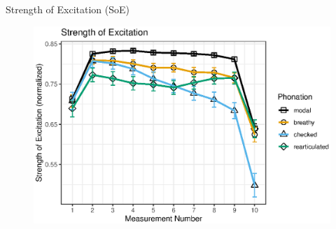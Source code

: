 \documentclass[professionalfonts]{beamer}
\begin{document}
\begin{frame}{Strength of Excitation (SoE)}
  \begin{figure}
    \centering
    \includegraphics[width = 0.8\linewidth]{images/slz_soe.eps}
  \end{figure}
\end{frame}
\end{document}

